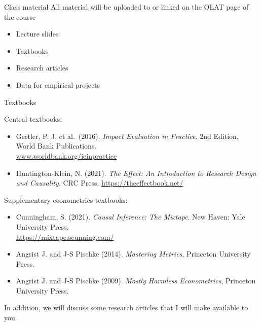 \documentclass[
  ignorenonframetext,
]{beamer}
\providecommand{\tightlist}{%
  \setlength{\itemsep}{0pt}\setlength{\parskip}{0pt}}
\begin{document}
\begin{frame}{Class material}
\label{class-material}
All material will be uploaded to or linked on the OLAT page of the
course

\begin{itemize}
\tightlist
\item
  Lecture slides
\item
  Textbooks
\item
  Research articles
\item
  Data for empirical projects
\end{itemize}
\end{frame}

\begin{frame}{Textbooks}
\label{textbooks}
\begin{block}{Central textbooks:}
\label{central-textbooks}
\begin{itemize}
\tightlist
\item
  Gertler, P. J. et al.~(2016). \emph{Impact Evaluation in Practice}.
  2nd Edition, World Bank Publications.\\
  \href{http://www.worldbank.org/ieinpractice}{www.worldbank.org/ieinpractice}
\item
  Huntington-Klein, N. (2021). \emph{The Effect: An Introduction to
  Research Design and Causality}. CRC Press.
  \url{https://theeffectbook.net/}
\end{itemize}
\end{block}

\begin{block}{Supplementary econometrics textbooks:}
\label{supplementary-econometrics-textbooks}
\begin{itemize}
\tightlist
\item
  Cunningham, S. (2021). \emph{Causal Inference: The Mixtape}. New
  Haven: Yale University Press.\\
  \url{https://mixtape.scunning.com/}
\item
  Angrist J. and J-S Pischke (2014). \emph{Mastering Metrics}, Princeton
  University Press.
\item
  Angrist J. and J-S Pischke (2009). \emph{Mostly Harmless
  Econometrics}, Princeton University Press.
\end{itemize}

In addition, we will discuss some research articles that I will make
available to you.
\end{block}
\end{frame}
\end{document}
